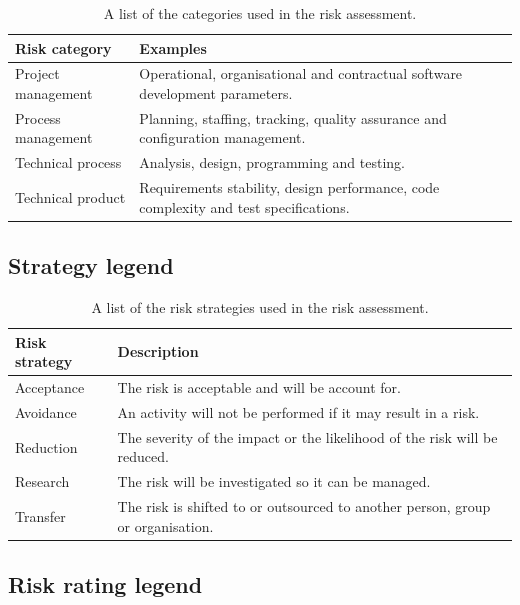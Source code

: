 \documentclass[a4paper]{article}
\begin{document}
\begin{appendices}
{{				\begin{table}[H]
				\begin{tabularx}{\textwidth}{@{}lX@{}}
					\toprule
					\textbf{Risk category} & \textbf{Examples} \\
					\midrule
					Project management & Operational, organisational and contractual software development parameters. \\
					Process management & Planning, staffing, tracking, quality assurance and configuration management. \\
					Technical process & Analysis, design, programming and testing. \\
					Technical product & Requirements stability, design performance, code complexity and test specifications. \\
					\bottomrule
				\end{tabularx}
				\caption{A list of the categories used in the risk assessment.}
				\end{table}
			
			}
			
			\subsection{Strategy legend} {
			\label{sec:strategy_legend}

				\begin{table}[H]
				\begin{tabularx}{\textwidth}{@{}lX@{}}
					\toprule
					\textbf{Risk strategy} & \textbf{Description} \\
					\midrule
					Acceptance & The risk is acceptable and will be account for. \\
					Avoidance & An activity will not be performed if it may result in a risk. \\
					Reduction & The severity of the impact or the likelihood of the risk will be reduced. \\
					Research & The risk will be investigated so it can be managed. \\
					Transfer & The risk is shifted to or outsourced to another person, group or organisation. \\
					\bottomrule
				\end{tabularx}
				\caption{A list of the risk strategies used in the risk assessment.}
				\end{table}

			}

			\subsection{Risk rating legend} {
			\label{sec:risk_rating_legend}

}}
\end{appendices}
\end{document}
